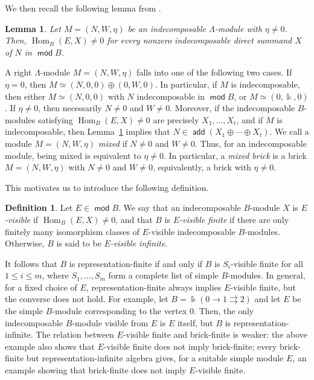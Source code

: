 \documentclass[a4,12pt]{amsart}
\numberwithin{equation}{section} %
\def\Hom{\operatorname{Hom}} %
\def\add{\operatorname{\mathsf{add}}}
\def\mod{\operatorname{\mathsf{mod}}}
\newtheorem{lemma}[theorem]{Lemma} %
\theoremstyle{definition} %
\newtheorem{definition}[theorem]{Definition} %
\begin{document}
We then recall the following lemma from \cite[Chapter~IV, Lemma~1.8]{SS-Vol-3}. 
\begin{lemma}\label{lem::hom-non-zero}
Let $M=(N,W,\eta)$ be an indecomposable $\Lambda$-module with $\eta\neq 0$. Then, $\Hom_B(E,X)\neq 0$ for every nonzero indecomposable direct summand $X$ of $N$ in $\mod B$. 
\end{lemma}

A right $\Lambda$-module $M=(N,W,\eta)$ falls into one of the following two cases. If $\eta=0$, then $M\simeq (N,0,0)\oplus(0,W,0)$. In particular, if $M$ is indecomposable, then either $M\simeq (N,0,0)$ with $N$ indecomposable in $\mod B$, or $M\simeq (0,\Bbbk,0)$. If $\eta\neq0$, then necessarily $N\neq0$ and $W\neq0$. Moreover, if the indecomposable $B$-modules satisfying $\Hom_B(E,X)\neq0$ are precisely $X_1,\ldots,X_t$, and if $M$ is indecomposable, then Lemma~\ref{lem::hom-non-zero} implies that $N\in\add(X_1\oplus\cdots\oplus X_t)$. We call a module $M=(N,W,\eta)$ \emph{mixed} if $N\neq0$ and $W\neq0$. Thus, for an indecomposable module, being mixed is equivalent to $\eta\neq0$. In particular, a \emph{mixed brick} is a brick $M=(N,W,\eta)$ with $N\neq0$ and $W\neq0$, equivalently, a brick with $\eta\neq0$.

This motivates us to introduce the following definition.
\begin{definition}
Let $E\in\mod B$. We say that an indecomposable $B$-module $X$ is \emph{$E$-visible} if $\Hom_B(E,X)\neq0$, and that $B$ is \emph{$E$-visible finite} if there are only finitely many isomorphism classes of $E$-visible indecomposable $B$-modules. Otherwise, $B$ is said to be \emph{$E$-visible infinite}.
\end{definition}

It follows that $B$ is representation-finite if and only if $B$ is $S_i$-visible finite for all $1\leq i\leq m$, where $S_1,\ldots,S_m$ form a complete list of simple $B$-modules. In general, for a fixed choice of $E$, representation-finite always implies $E$-visible finite, but the converse does not hold. For example, let $B=\Bbbk(0\longrightarrow 1 \rightrightarrows 2)$ and let $E$ be the simple $B$-module corresponding to the vertex $0$. Then, the only indecomposable $B$-module visible from $E$ is $E$ itself, but $B$ is representation-infinite. The relation between $E$-visible finite and brick-finite is weaker: the above example also shows that $E$-visible finite does not imply brick-finite; every brick-finite but representation-infinite algebra gives, for a suitable simple module $E$, an example showing that brick-finite does not imply $E$-visible finite.
\end{document}
